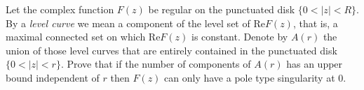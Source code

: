 Let the complex function $F(z)$ be regular on the punctuated disk $\{ 0<|z| < R\}$. By a \textit{level curve} we mean a component of the level set of $\mathrm{Re}F(z)$, that is, a maximal connected set on which $\mathrm{Re}F(z)$ is constant. Denote by $A(r)$ the union of those level curves that are entirely contained in the punctuated disk $\{ 0<|z|<r\}$. Prove that if the number of components of $A(r)$ has an upper bound independent of $r$ then $F(z)$ can only have a pole type singularity at $0$.